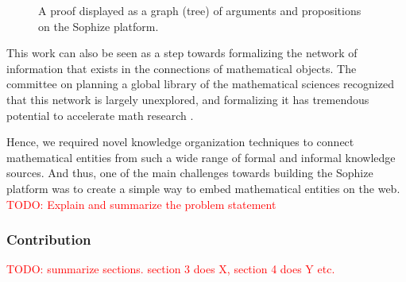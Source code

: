\documentclass[a4paper]{article}
\newcommand\todo[1]{\textcolor{red}{TODO: #1}}
\begin{document}
\begin{figure}[ht]
\begin{center}
\caption{A proof displayed as a graph (tree) of arguments and propositions on the Sophize platform.}
\label{proof_tree}
\end{center}
\end{figure}

This work can also be seen as a step towards formalizing the network of information that exists in the connections of mathematical objects. The committee on planning a global library of the mathematical sciences recognized that this network is largely unexplored, and formalizing it has tremendous potential to accelerate math research \cite{sciences2014developing}.

Hence, we required novel knowledge organization techniques to connect mathematical entities from such a wide range of formal and informal knowledge sources. And thus, one of the main challenges towards building the Sophize platform was to create a simple way to embed mathematical entities on the web. \todo{Explain and summarize the problem statement}


\subsubsection*{Contribution}
\todo{summarize sections. section 3 does X, section 4 does Y etc.}
\end{document}
